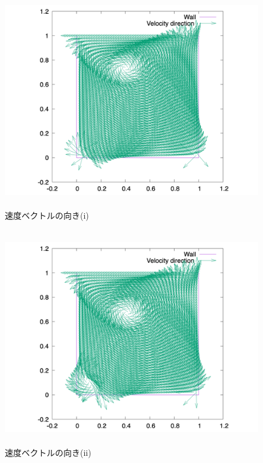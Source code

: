 \documentclass[upLaTeX,a4paper]{jsarticle}
\begin{document}
\begin{figure}[H]
  \centering
  \includegraphics[height=9.5cm]{outputs/img/velocity_abs_re50.png}
  \caption{速度ベクトルの向き(i)}
\end{figure}
\begin{figure}[H]
  \centering
  \includegraphics[height=9.5cm]{outputs/img/velocity_abs_re200.png}
  \caption{速度ベクトルの向き(ii)}
\end{figure}
\end{document}

